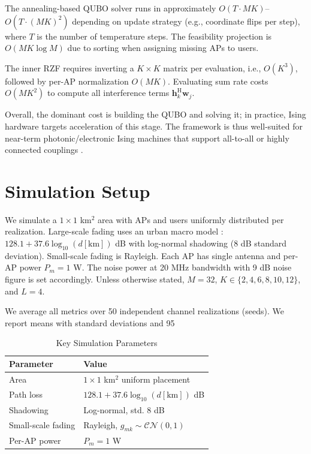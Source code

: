 {The annealing-based QUBO solver runs in approximately $O(T\cdot MK)$–$O(T\cdot (MK)^2)$ depending on update strategy (e.g., coordinate flips per step), where $T$ is the number of temperature steps. The feasibility projection is $O(MK\log M)$ due to sorting when assigning missing APs to users.

The inner RZF requires inverting a $K\times K$ matrix per evaluation, i.e., $O(K^3)$, followed by per-AP normalization $O(MK)$. Evaluating sum rate costs $O(MK^2)$ to compute all interference terms $\mathbf{h}_k^\mathrm{H}\mathbf{w}_j$.

Overall, the dominant cost is building the QUBO and solving it; in practice, Ising hardware targets acceleration of this stage. The framework is thus well-suited for near-term photonic/electronic Ising machines that support all-to-all or highly connected couplings \cite{mcmahon2016fully,inagaki2016coherent}.

\section{Simulation Setup}
We simulate a $1\times 1$ km$^2$ area with APs and users uniformly distributed per realization. Large-scale fading uses an urban macro model \cite{bjornson2016massive}: $128.1+37.6\log_{10}(d[\mathrm{km}])$ dB with log-normal shadowing (8 dB standard deviation). Small-scale fading is Rayleigh. Each AP has single antenna and per-AP power $P_m=1$ W. The noise power at 20 MHz bandwidth with 9 dB noise figure is set accordingly. Unless otherwise stated, $M=32$, $K\in\{2,4,6,8,10,12\}$, and $L=4$.

We average all metrics over 50 independent channel realizations (seeds). We report means with standard deviations and 95%

\begin{table}[htbp]
\caption{Key Simulation Parameters}
\centering
\begin{tabular}{@{}ll@{}}
\toprule
Parameter & Value \\ \midrule
Area & $1\times 1$ km$^2$ uniform placement \\
Path loss & $128.1+37.6\log_{10}(d[\mathrm{km}])$ dB \\
Shadowing & Log-normal, std. 8 dB \\
Small-scale fading & Rayleigh, $g_{mk}\sim\mathcal{CN}(0,1)$ \\
Per-AP power & $P_m=1$ W \\


\end{tabular}
\end{table}}
